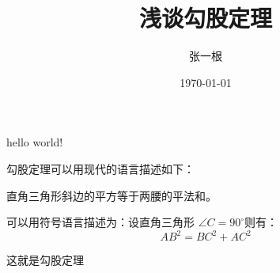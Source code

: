 \documentclass{article}
\title{\heiti 浅谈勾股定理}
\author{\kaishu 张一根}
\date{\today}
\newcommand\degree{^\circ}
\begin{document}
	\maketitle
	hello world!
	
	勾股定理可以用现代的语言描述如下：
	
	直角三角形斜边的平方等于两腰的平法和。
	
	可以用符号语言描述为：设直角三角形 
	$\angle C=90\degree $则有：
	\begin{equation}
		AB^2 = BC^2 + AC^2
	\end{equation}
	
	这就是勾股定理
\end{document}
